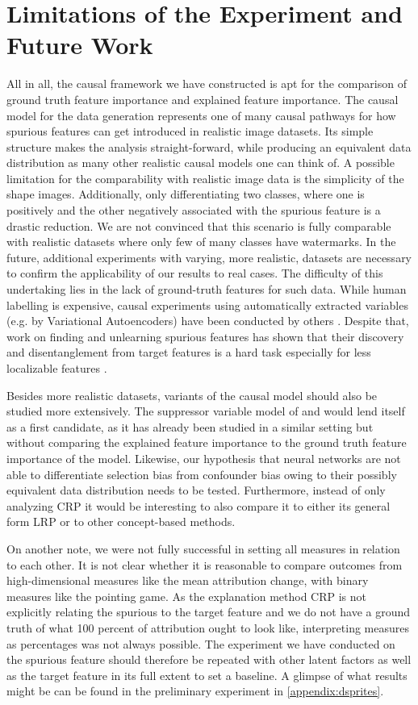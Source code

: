 \section{Limitations of the Experiment and Future Work}
All in all, the causal framework we have constructed is apt for the comparison of ground truth feature importance and explained feature importance. The causal model for the data generation represents one of many causal pathways for how spurious features can get introduced in realistic image datasets. Its simple structure makes the analysis straight-forward, while producing an equivalent data distribution as many other realistic causal models one can think of.
A possible limitation for the comparability with realistic image data is the simplicity of the shape images. Additionally, only differentiating two classes, where one is positively and the other negatively associated with the spurious feature is a drastic reduction. We are not convinced that this scenario is fully comparable with realistic datasets where only few of many classes have watermarks.
In the future, additional experiments with varying, more realistic, datasets are necessary to confirm the applicability of our results to real cases. The difficulty of this undertaking lies in the lack of ground-truth features for such data. While human labelling is expensive, causal experiments using automatically extracted variables (e.g. by Variational Autoencoders) have been conducted by others \citep{Reimers2020, Goyal2019, Tran2022}. Despite that, work on finding and unlearning spurious features has shown that their discovery and disentanglement from target features is a hard task especially for less localizable features \citep{Dreyer2023a}.

Besides more realistic datasets, variants of the causal model should also be studied more extensively. The suppressor variable model of \cite{Clark2023} and \cite{Wilming2022} would lend itself as a first candidate, as it has already been studied in a similar setting but without comparing the explained feature importance to the ground truth feature importance of the model. Likewise, our hypothesis that neural networks are not able to differentiate selection bias from confounder bias owing to their possibly equivalent data distribution needs to be tested. 
Furthermore, instead of only analyzing CRP it would be interesting to also compare it to either its general form LRP or to other concept-based methods. 

On another note, we were not fully successful in setting all measures in relation to each other. It is not clear whether it is reasonable to compare outcomes from high-dimensional measures like the mean attribution change, with binary measures like the pointing game. As the explanation method CRP is not explicitly relating the spurious to the target feature and we do not have a ground truth of what 100 percent of attribution ought to look like, interpreting measures as percentages was not always possible. The experiment we have conducted on the spurious feature should therefore be repeated with other latent factors as well as the target feature in its full extent to set a baseline. A glimpse of what results might be can be found in the preliminary experiment in \cref{appendix:dsprites}.


